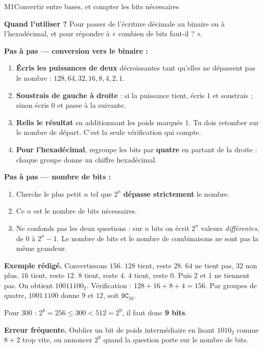 \begin{fichemethode}{M1}{Convertir entre bases, et compter les bits nécessaires}

\textbf{Quand l'utiliser ?} Pour passer de l'écriture décimale au binaire ou à
l'hexadécimal, et pour répondre à « combien de bits faut-il ? ».

\textbf{Pas à pas — conversion vers le binaire :}
\begin{enumerate}
  \item \textbf{Écris les puissances de deux} décroissantes tant qu'elles ne dépassent pas le
        nombre : $128, 64, 32, 16, 8, 4, 2, 1$.
  \item \textbf{Soustrais de gauche à droite} : si la puissance tient, écris $1$ et soustrais ;
        sinon écris $0$ et passe à la suivante.
  \item \textbf{Relis le résultat} en additionnant les poids marqués $1$. Tu dois retomber sur
        le nombre de départ. C'est la seule vérification qui compte.
  \item \textbf{Pour l'hexadécimal}, regroupe les bits par \textbf{quatre} en partant de la
        droite : chaque groupe donne un chiffre hexadécimal.
\end{enumerate}

\textbf{Pas à pas — nombre de bits :}
\begin{enumerate}
  \item Cherche le plus petit $n$ tel que $2^n$ \textbf{dépasse strictement} le nombre.
  \item Ce $n$ est le nombre de bits nécessaires.
  \item Ne confonds pas les deux questions : sur $n$ bits on écrit $2^n$ valeurs
        \emph{différentes}, de $0$ à $2^n - 1$. Le nombre de bits et le nombre de combinaisons
        ne sont pas la même grandeur.
\end{enumerate}

\textbf{Exemple rédigé.} Convertissons $156$.
$128$ tient, reste $28$. $64$ ne tient pas, $32$ non plus. $16$ tient, reste $12$.
$8$ tient, reste $4$. $4$ tient, reste $0$. Puis $2$ et $1$ ne tiennent pas.
On obtient $10011100_2$. Vérification : $128+16+8+4 = 156$.
Par groupes de quatre, $1001\,1100$ donne $9$ et $12$, soit $\mathtt{9C}_{16}$.

Pour $300$ : $2^8 = 256 \leq 300 < 512 = 2^9$, il faut donc \textbf{9 bits}.

\textbf{Erreur fréquente.} Oublier un bit de poids intermédiaire en lisant $1010_2$ comme
$8+2$ trop vite, ou annoncer $2^9$ quand la question porte sur le nombre de bits.

\end{fichemethode}
